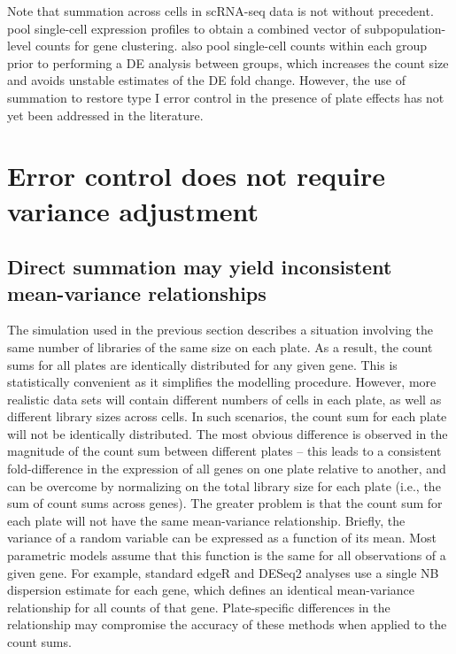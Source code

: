 \documentclass[oupdraft]{bio}
\begin{document}
Note that summation across cells in scRNA-seq data is not without precedent.
\cite{jaitin2014massively} pool single-cell expression profiles to obtain a combined vector of subpopulation-level counts for gene clustering.
\cite{klein2015droplet} also pool single-cell counts within each group prior to performing a DE analysis between groups,
    which increases the count size and avoids unstable estimates of the DE fold change.
However, the use of summation to restore type I error control in the presence of plate effects has not yet been addressed in the literature.

\section{Error control does not require variance adjustment}

\subsection{Direct summation may yield inconsistent mean-variance relationships}
The simulation used in the previous section describes a situation involving the same number of libraries of the same size on each plate.
As a result, the count sums for all plates are identically distributed for any given gene.
This is statistically convenient as it simplifies the modelling procedure.
However, more realistic data sets will contain different numbers of cells in each plate, as well as different library sizes across cells.
In such scenarios, the count sum for each plate will not be identically distributed.
The most obvious difference is observed in the magnitude of the count sum between different plates
    -- this leads to a consistent fold-difference in the expression of all genes on one plate relative to another,
    and can be overcome by normalizing on the total library size for each plate (i.e., the sum of count sums across genes).
The greater problem is that the count sum for each plate will not have the same mean-variance relationship.
Briefly, the variance of a random variable can be expressed as a function of its mean.
Most parametric models assume that this function is the same for all observations of a given gene.
For example, standard edgeR and DESeq2 analyses use a single NB dispersion estimate for each gene, which defines an identical mean-variance relationship for all counts of that gene.
Plate-specific differences in the relationship may compromise the accuracy of these methods when applied to the count sums.
\end{document}
